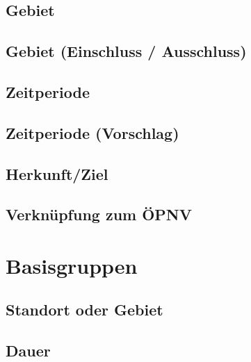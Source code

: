 \subsection*{Gebiet}



\subsection*{Gebiet (Einschluss / Ausschluss)}



\subsection*{Zeitperiode}



\subsection*{Zeitperiode (Vorschlag)}



\subsection*{Herkunft/Ziel}



\subsection*{Verknüpfung zum ÖPNV}



\section{Basisgruppen}
\label{sec:Datenmodell:Baisgruppen}

\subsection*{Standort oder Gebiet}



\subsection*{Dauer}



